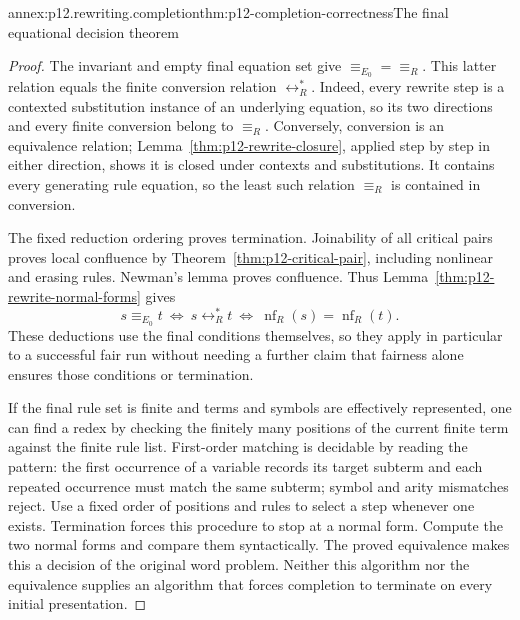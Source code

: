 \begin{annexitem}{annex:p12.rewriting.completion}{thm:p12-completion-correctness}{The final equational decision theorem}
\begin{proof}
The invariant and empty final equation set give
\(\equiv_{E_0}=\equiv_R\). This latter relation equals the finite
conversion relation \(\leftrightarrow_R^*\). Indeed, every rewrite
step is a contexted substitution instance of an underlying equation,
so its two directions and every finite conversion belong to
\(\equiv_R\). Conversely, conversion is an equivalence relation;
Lemma~\ref{thm:p12-rewrite-closure}, applied step by step in either
direction, shows it is closed under contexts and substitutions. It
contains every generating rule equation, so the least such relation
\(\equiv_R\) is contained in conversion.

The fixed reduction ordering proves termination. Joinability of all
critical pairs proves local confluence by
Theorem~\ref{thm:p12-critical-pair}, including nonlinear and erasing
rules. Newman's lemma proves confluence. Thus
Lemma~\ref{thm:p12-rewrite-normal-forms} gives
\[
 s\equiv_{E_0}t
 \ \Longleftrightarrow\ s\mathrel{\leftrightarrow_R^*}t
 \ \Longleftrightarrow\
 \operatorname{nf}_R(s)=\operatorname{nf}_R(t).
\]
These deductions use the final conditions themselves, so they apply
in particular to a successful fair run without needing a further
claim that fairness alone ensures those conditions or termination.

If the final rule set is finite and terms and symbols are effectively
represented, one can find a redex by checking the finitely many positions
of the current finite term against the finite rule list. First-order
matching is decidable by reading the pattern: the first occurrence of
a variable records its target subterm and each repeated occurrence
must match the same subterm; symbol and arity mismatches reject.
Use a fixed order of positions and rules to select a step whenever one
exists. Termination forces this procedure to stop at a normal form.
Compute the two normal forms and compare them syntactically. The proved
equivalence makes this a decision of the original word problem.
Neither this algorithm nor the equivalence supplies an algorithm that
forces completion to terminate on every initial presentation.
\end{proof}
\end{annexitem}

